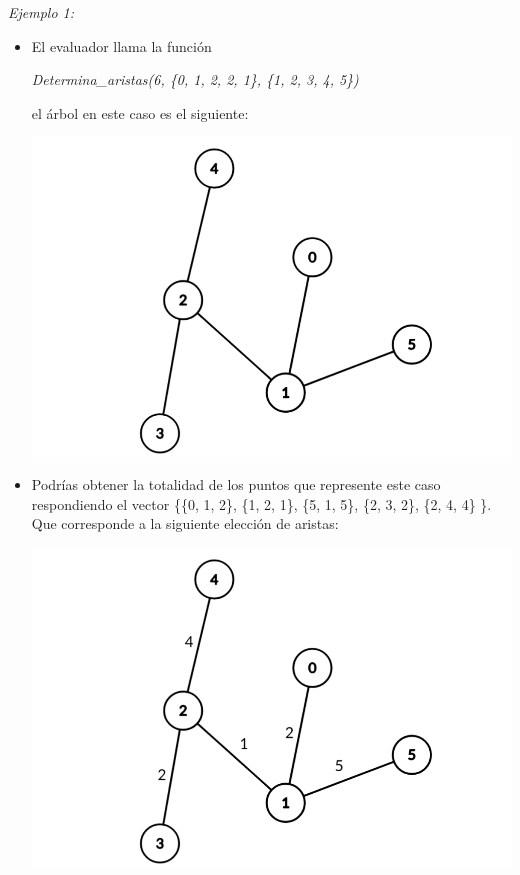 \documentclass[12pt]{scrartcl}
\begin{document}
        {\itshape Ejemplo 1:}
        \begin{itemize}
            \item El evaluador llama la función 
            \begin{center}
                \textit{Determina\_aristas(6, \{0, 1, 2, 2, 1\}, \{1, 2, 3, 4, 5\})}
            \end{center}
            el árbol en este caso es el siguiente:
            \begin{center}
                \includegraphics[scale=0.25]{ej1.png}
            \end{center}
            \item Podrías obtener la totalidad de los puntos que represente este caso respondiendo el vector \{\{0, 1, 2\}, \{1, 2, 1\}, \{5, 1, 5\}, \{2, 3, 2\}, \{2, 4, 4\} \}. Que corresponde a la siguiente elección de aristas:
            \begin{center}
                \includegraphics[scale=0.25]{ej2.png}

\end{center}
\end{itemize}
\end{document}
